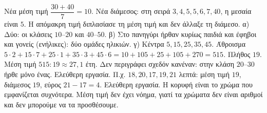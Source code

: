  Νέα μέση τιμή $\dfrac{30+40}{7}=10$. Νέα διάμεσος: στη σειρά $3,4,5,5,6,7,40$, η μεσαία είναι $5$. Η απόμακρη τιμή διπλασίασε τη μέση τιμή και δεν άλλαξε τη διάμεσο.
 α) Δύο: οι κλάσεις $10$--$20$ και $40$--$50$. β) Στο πανηγύρι ήρθαν κυρίως παιδιά και έφηβοι και γονείς (ενήλικες): δύο ομάδες ηλικιών. γ) Κέντρα $5,15,25,35,45$. Άθροισμα $5\cdot2+15\cdot7+25\cdot1+35\cdot3+45\cdot6=10+105+25+105+270=515$. Πλήθος $19$. Μέση τιμή $515:19\approx27{,}1$ έτη. Δεν περιγράφει σχεδόν κανέναν: στην κλάση $20$--$30$ ήρθε μόνο ένας.
 Ελεύθερη εργασία. Π.χ. $18,20,17,19,21$ λεπτά: μέση τιμή $19$, διάμεσος $19$, εύρος $21-17=4$.
 Ελεύθερη εργασία. Η κορυφή είναι το χρώμα που εμφανίζεται συχνότερα. Μέση τιμή δεν έχει νόημα, γιατί τα χρώματα δεν είναι αριθμοί και δεν μπορούμε να τα προσθέσουμε.
